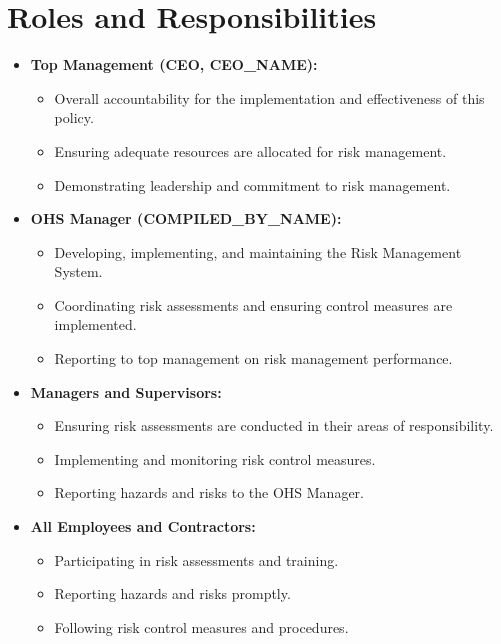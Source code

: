\documentclass[12pt]{article}
\begin{document}
\section{Roles and Responsibilities}
\begin{itemize}
    \item \textbf{Top Management (CEO, {{CEO_NAME}}):}
    \begin{itemize}
        \item Overall accountability for the implementation and effectiveness of this policy.
        \item Ensuring adequate resources are allocated for risk management.
        \item Demonstrating leadership and commitment to risk management.
    \end{itemize}
    \item \textbf{OHS Manager ({{COMPILED_BY_NAME}}):}
    \begin{itemize}
        \item Developing, implementing, and maintaining the Risk Management System.
        \item Coordinating risk assessments and ensuring control measures are implemented.
        \item Reporting to top management on risk management performance.
    \end{itemize}
    \item \textbf{Managers and Supervisors:}
    \begin{itemize}
        \item Ensuring risk assessments are conducted in their areas of responsibility.
        \item Implementing and monitoring risk control measures.
        \item Reporting hazards and risks to the OHS Manager.
    \end{itemize}
    \item \textbf{All Employees and Contractors:}
    \begin{itemize}
        \item Participating in risk assessments and training.
        \item Reporting hazards and risks promptly.
        \item Following risk control measures and procedures.
    \end{itemize}
\end{itemize}
\end{document}
